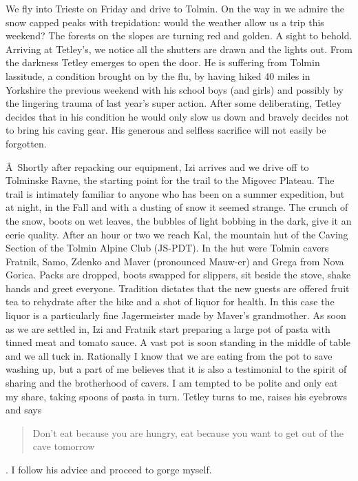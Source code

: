 We fly into Trieste on Friday and drive to Tolmin. On the way in we
admire the snow capped peaks with trepidation: would the weather allow
us a trip this weekend? The forests on the slopes are turning red and
golden. A sight to behold. Arriving at Tetley's, we notice all the
shutters are drawn and the lights out. From the darkness Tetley emerges
to open the door. He is suffering from Tolmin lassitude, a condition
brought on by the flu, by having hiked 40 miles in Yorkshire the
previous weekend with his school boys (and girls) and possibly by the
lingering trauma of last year's super action. After some deliberating,
Tetley decides that in his condition he would only slow us down and
bravely decides not to bring his caving gear. His generous and selfless
sacrifice will not easily be forgotten.

Â~Shortly after repacking our equipment, Izi arrives and we drive off to
Tolminske Ravne, the starting point for the trail to the Migovec
Plateau. The trail is intimately familiar to anyone who has been on a
summer expedition, but at night, in the Fall and with a dusting of snow
it seemed strange. The crunch of the snow, boots on wet leaves, the
bubbles of light bobbing in the dark, give it an eerie quality. After an
hour or two we reach Kal, the mountain hut of the Caving Section of the
Tolmin Alpine Club (JS-PDT). In the hut were Tolmin cavers Fratnik,
Samo, Zdenko and Maver (pronounced Mauw-er) and Grega from Nova Gorica.
Packs are dropped, boots swapped for slippers, sit beside the stove,
shake hands and greet everyone. Tradition dictates that the new guests
are offered fruit tea to rehydrate after the hike and a shot of liquor
for health. In this case the liquor is a particularly fine Jagermeister
made by Maver's grandmother. As soon as we are settled in, Izi and
Fratnik start preparing a large pot of pasta with tinned meat and tomato
sauce. A vast pot is soon standing in the middle of table and we all
tuck in. Rationally I know that we are eating from the pot to save
washing up, but a part of me believes that it is also a testimonial to
the spirit of sharing and the brotherhood of cavers. I am tempted to be
polite and only eat my share, taking spoons of pasta in turn. Tetley
turns to me, raises his eyebrows and says

\begin{quote} Don't eat because you are hungry, eat because you want to get out of the cave tomorrow \end{quote}

. I follow his advice and proceed to gorge myself.

